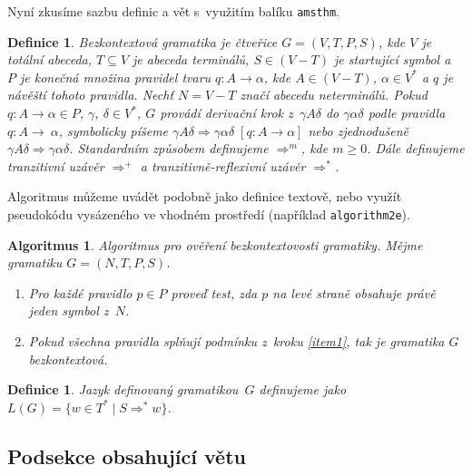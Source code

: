 \documentclass[a4paper,11pt]{article}
\newtheorem{definice}[subsection]{Definice}
\newtheorem{algoritmus}[subsection]{Algoritmus}
\begin{document}
	Nyní zkusíme sazbu definic a vět s~využitím balíku \verb$amsthm$.\par

	\begin{definice}
		\label{def1.1} Bezkontextová gramatika \textup{je čtveřice $G=(V,T,P,S)$, 
			kde $V$ je totální abeceda, $T \subseteq V$ je abeceda terminálů, 
			$S\in (V-T)$ je startující symbol a~$P$ je konečná množina 
			\emph{pravidel} tvaru $q\colon A\rightarrow \alpha$, 
			kde $A\in (V-T)$, $\alpha\in V^*$ a $q$ je návěští tohoto pravidla. 
			Nechť $N=V-T$ značí abecedu neterminálů.
			Pokud $q\colon A\rightarrow\alpha\in P$, $\gamma$, 
			$\delta\in V^*$, $G$ provádí derivační krok z~$\gamma A\delta$ do $\gamma\alpha\delta$ podle pravidla $q\colon A\rightarrow~\alpha$, 
			symbolicky píšeme $\gamma A\delta\Rightarrow\gamma\alpha\delta\;
			[q\colon A\rightarrow\alpha]$ nebo zjednodušeně $\gamma A\delta\Rightarrow\gamma\alpha\delta$. Standardním způsobem definujeme  $\Rightarrow^m$, kde $m\geq 0$. Dále definujeme tranzitivní uzávěr 
			$\Rightarrow^+$ a tranzitivně-reflexivní uzávěr $\Rightarrow^*$.}\par
	\end{definice}
	
	\textup{Algoritmus můžeme uvádět podobně jako definice textově, 
		nebo využít pseudokódu vysázeného ve vhodném prostředí (například} \verb$algorithm2e$\textup{).}
	
	\begin{algoritmus}
		Algoritmus pro ověření bezkontextovosti gramatiky. 
		Mějme gramatiku $G = (N, T, P, S)$.
		
		\begin{enumerate}
			\item \label{item1}Pro každé pravidlo $p\in P$ proveď test, 
			zda $p$ na levé straně obsahuje právě jeden symbol z~$N$.
			\item Pokud všechna pravidla splňují podmínku z~kroku \ref{item1}, 
			tak je gramatika $G$ bezkontextová.
		\end{enumerate}
	
	\end{algoritmus}
	
	\begin{definice}
		Jazyk \textup{definovaný gramatikou~$G$ definujeme 
			jako $L(G)=\{w\in T^* \mid S\Rightarrow^* w\}$.}
	\end{definice}
	
	\setcounter{subsection}{0}
	\subsection{Podsekce obsahující větu}
	
\end{document}
